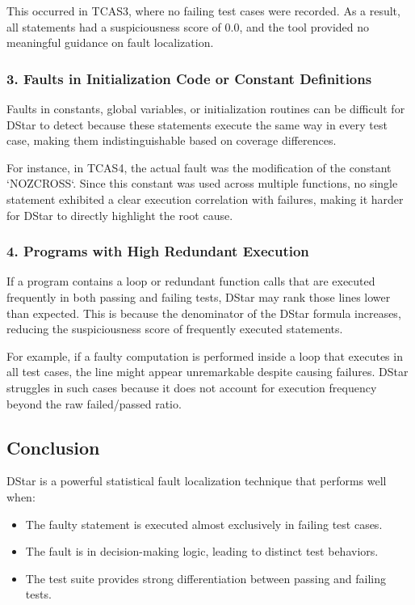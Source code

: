 \documentclass[conference]{IEEEtran}
\begin{document}
This occurred in TCAS3, where no failing test cases were recorded. As a result, all statements had a suspiciousness score of 0.0, and the tool provided no meaningful guidance on fault localization.

\subsubsection{3. Faults in Initialization Code or Constant Definitions}
Faults in constants, global variables, or initialization routines can be difficult for DStar to detect because these statements execute the same way in every test case, making them indistinguishable based on coverage differences.

For instance, in TCAS4, the actual fault was the modification of the constant `NOZCROSS`. Since this constant was used across multiple functions, no single statement exhibited a clear execution correlation with failures, making it harder for DStar to directly highlight the root cause.

\subsubsection{4. Programs with High Redundant Execution}
If a program contains a loop or redundant function calls that are executed frequently in both passing and failing tests, DStar may rank those lines lower than expected. This is because the denominator of the DStar formula increases, reducing the suspiciousness score of frequently executed statements.

For example, if a faulty computation is performed inside a loop that executes in all test cases, the line might appear unremarkable despite causing failures. DStar struggles in such cases because it does not account for execution frequency beyond the raw failed/passed ratio.

\subsection{Conclusion}
DStar is a powerful statistical fault localization technique that performs well when:
\begin{itemize}
    \item The faulty statement is executed almost exclusively in failing test cases.
    \item The fault is in decision-making logic, leading to distinct test behaviors.
    \item The test suite provides strong differentiation between passing and failing tests.
\end{itemize}
\end{document}
